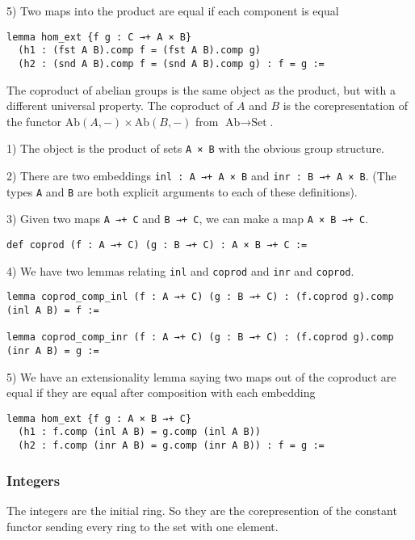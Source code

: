 \documentclass[12pt]{article} %
\theoremstyle{definition}
\theoremstyle{definition}
\theoremstyle{definition}
\theoremstyle{definition}
\begin{document}
5) Two maps into the product are equal if each component is equal
\begin{lstlisting}
lemma hom_ext {f g : C →+ A × B}
  (h1 : (fst A B).comp f = (fst A B).comp g) 
  (h2 : (snd A B).comp f = (snd A B).comp g) : f = g :=
\end{lstlisting}

The coproduct of abelian groups is the same object as the product, 
but with a different universal property. The coproduct of $A$ and $B$
is the corepresentation of the functor $\text{Ab}(A, -) \times \text{Ab}(B, -)$
from $\text{Ab} \to \text{Set}$.

1) The object is the product of sets \lstinline{A × B} with the obvious
group structure.

2) There are two embeddings \lstinline{inl : A →+ A × B} and 
\lstinline{inr : B →+ A × B}. (The types \lstinline{A} and \lstinline{B}
are both explicit arguments to each of these definitions).

3) Given two maps \lstinline{A →+ C} and \lstinline{B →+ C}, we can make a map
\lstinline{A × B →+ C}.
\begin{lstlisting}
def coprod (f : A →+ C) (g : B →+ C) : A × B →+ C :=
\end{lstlisting}

4) We have two lemmas relating \lstinline{inl} and \lstinline{coprod} and \lstinline{inr}
and \lstinline{coprod}.
\begin{lstlisting}
lemma coprod_comp_inl (f : A →+ C) (g : B →+ C) : (f.coprod g).comp (inl A B) = f :=

lemma coprod_comp_inr (f : A →+ C) (g : B →+ C) : (f.coprod g).comp (inr A B) = g :=
\end{lstlisting}

5) We have an extensionality lemma saying two maps out of the coproduct are equal 
if they are equal after composition with each embedding
\begin{lstlisting}
lemma hom_ext {f g : A × B →+ C}
  (h1 : f.comp (inl A B) = g.comp (inl A B)) 
  (h2 : f.comp (inr A B) = g.comp (inr A B)) : f = g :=
\end{lstlisting}

\subsubsection{Integers}
The integers are the initial ring. So they are the corepresention of the 
constant functor sending every ring to the set with one element.
\end{document}
